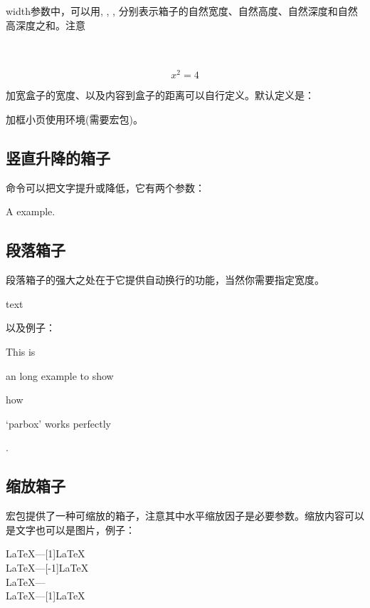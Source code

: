 width参数中，可以用, , , 分别表示箱子的自然宽度、自然高度、自然深度和自然高深度之和。注意

\begin{codeshow}
 \\
\\
\begin{equation}\boxed{x^2=4}
\end{equation}
\end{codeshow}

加宽盒子的宽度、以及内容到盒子的距离可以自行定义。默认定义是：
\begin{latex}
\setlength{\fboxrule}{0.4pt} \setlength{\fboxsep}{3pt}
\end{latex}

加框小页使用环境(需要宏包)。

\subsection{竖直升降的箱子}
命令可以把文字提升或降低，它有两个参数：

\begin{codeshow}
A\raisebox{-0.5ex}{n} example.
\end{codeshow}

\subsection{段落箱子}
段落箱子的强大之处在于它提供自动换行的功能，当然你需要指定宽度。
\begin{latex}
\parbox[pos]{width}{text}
\end{latex}

以及例子：

\begin{codeshow}
This is \parbox[t]{3.5em}{an long
example to show} how \parbox[b]
{4em}{`parbox' works perfectly}.
\end{codeshow}

\subsection{缩放箱子}
宏包提供了一种可缩放的箱子，注意其中水平缩放因子是必要参数。缩放内容可以是文字也可以是图片，例子：
\begin{codeshow}
\LaTeX---\scalebox{-1}[1]{\LaTeX}\\
\LaTeX---\scalebox{1}[-1]{\LaTeX}\\
\LaTeX---\scalebox{-1}{\LaTeX}\\
\LaTeX---\scalebox{2}[1]{\LaTeX}
\end{codeshow}

